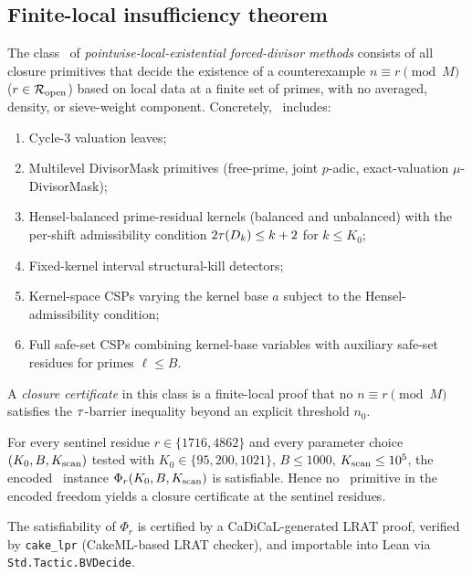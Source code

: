 \subsection{Finite-local insufficiency theorem}
\label{sec:thm:ple-barrier}

\begin{definition}
\label{def:ple}
The class \PLEclass\ of \emph{pointwise-local-existential
forced-divisor methods} consists of all closure primitives that decide
the existence of a counterexample $n \equiv r \pmod M$ ($r \in \mathcal{R}_{\mathrm{open}}$)
based on local data at a finite set of primes, with no averaged,
density, or sieve-weight component. Concretely, \PLEclass\ includes:

\begin{enumerate}[label=(\roman*), leftmargin=*]
\item Cycle-3 valuation leaves;
\item Multilevel DivisorMask primitives (free-prime, joint $p$-adic,
  exact-valuation $\mu$-DivisorMask);
\item Hensel-balanced prime-residual kernels (balanced and unbalanced)
  with the per-shift admissibility condition $2\tau(D_k) \le k+2$
  for $k \le K_0$;
\item Fixed-kernel interval structural-kill detectors;
\item Kernel-space CSPs varying the kernel base $a$ subject to the
  Hensel-admissibility condition;
\item Full safe-set CSPs combining kernel-base variables with
  auxiliary safe-set residues for primes $\ell \le B$.
\end{enumerate}

A \emph{closure certificate} in this class is a finite-local proof
that no $n \equiv r \pmod M$ satisfies the $\tau$-barrier inequality
beyond an explicit threshold $n_0$.
\end{definition}

\begin{theorem}
\label{thm:ple-insufficiency}
For every sentinel residue $r \in \{1716, 4862\}$ and every parameter
choice $(K_0, B, K_{\rm scan})$ tested with $K_0 \in \{95, 200, 1021\}$,
$B \le 1000$, $K_{\rm scan} \le 10^5$, the encoded \PLEclass\ instance
$\Phi_r(K_0, B, K_{\rm scan})$ is satisfiable. Hence no \PLEclass\
primitive in the encoded freedom yields a closure certificate at the
sentinel residues.

The satisfiability of $\Phi_r$ is certified by a CaDiCaL-generated
LRAT proof, verified by \texttt{cake\_lpr} (CakeML-based LRAT
checker), and importable into Lean via
\texttt{Std.Tactic.BVDecide}.
\end{theorem}

